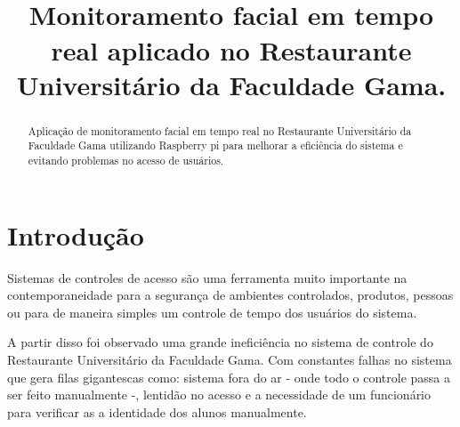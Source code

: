 \documentclass[conference,compsoc]{IEEEtran}
\begin{document}
\title{\\Monitoramento facial em tempo real aplicado no Restaurante Universitário da Faculdade Gama.}



\author{
\and
{}
}
\maketitle


\begin{abstract}
Aplicação de monitoramento facial em tempo real no Restaurante Universitário da Faculdade Gama utilizando Raspberry pi para melhorar a eficiência do sistema e evitando problemas no acesso de usuários. \cite{referencia:3} 
\end{abstract}
\IEEEpeerreviewmaketitle
\section{Introdução}
Sistemas de controles de acesso são uma ferramenta muito importante na contemporaneidade para a segurança de ambientes controlados, produtos, pessoas ou para de maneira simples um controle de tempo dos usuários do sistema. \cite{referencia:7}

A partir disso foi observado uma grande ineficiência no sistema de controle do Restaurante Universitário da Faculdade Gama. Com constantes falhas no sistema que gera filas gigantescas como: sistema fora do ar - onde todo o controle passa a ser feito manualmente -, lentidão no acesso e a necessidade de um funcionário para verificar as a identidade dos alunos manualmente. 

\end{document}
